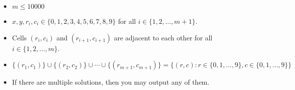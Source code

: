 \begin{itemize}
\tightlist
\item $m\le 10000$
\item $x,y,r_i,c_i\in\{0,1,2,3,4,5,6,7,8,9\}$ for all $i\in\{1,2,\ldots,m+1\}$. 
\item Cells $(r_i,c_i)$ and $(r_{i+1},c_{i+1})$ are adjacent to each other 
      for all $i\in\{1,2,\ldots,m\}$.
\item $\{(r_1,c_1)\}\cup\{(r_2,c_2)\}\cup\cdots\cup\{(r_{m+1},c_{m+1})\}=\{(r,c):r\in\{0,1,\dots,9\},c\in\{0,1,\dots,9\}\}$
\item If there are multiple solutions, then you may output any of them.
\end{itemize}
